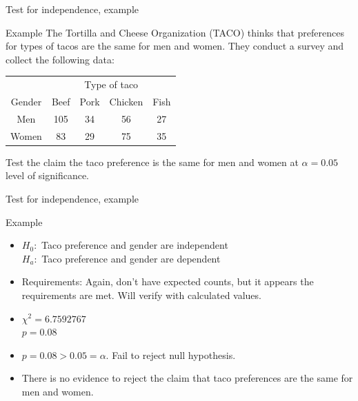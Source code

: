 \documentclass[xcolor=table, handout]{beamer}
\begin{document}
\begin{frame}{Test for independence, example}
\begin{exampleblock}{Example}
The Tortilla and Cheese Organization (TACO) thinks that preferences for types of tacos are the same for men and women. They conduct a survey and collect the following data:\\
\medskip
{\centering
\begin{tabular}{c | c  c c c}
\multicolumn{1}{c}{} & \multicolumn{4}{c}{\large Type of taco}\\
Gender & Beef & Pork & Chicken & Fish\\
\hline
Men & 105 & 34 & 56 & 27\\
Women & 83 & 29 & 75 & 35 \\
\end{tabular}
\par}
\bigskip
Test the claim the taco preference is the same for men and women at $\alpha = 0.05$ level of significance.
\end{exampleblock}
\end{frame}

\begin{frame}{Test for independence, example}
\begin{exampleblock}{Example}
\begin{itemize}
\pause\item $H_0:$ Taco preference and gender are independent\\
$H_a:$ Taco preference and gender are dependent
\pause\item Requirements: Again, don't have expected counts, but it appears the requirements are met. Will verify with calculated values.
\pause\item $\chi^2 = 6.7592767$\\
$p = 0.08 $
\pause\item $p = 0.08 > 0.05 = \alpha$. Fail to reject null hypothesis.
\pause\item There is no evidence to reject the claim that taco preferences are the same for men and women.
\end{itemize}
\end{exampleblock}
\end{frame}
\end{document}

